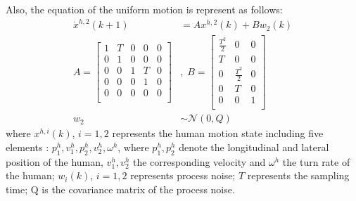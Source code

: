 \documentclass[letterpaper, 10 pt, conference]{ieeeconf}
\begin{document}
	Also, the equation of the uniform motion is represent as follows:
	\begin{subequations}
		\begin{align*}
			\dot{x}^{h,2}(k+1)&= Ax^{h,2}(k)+Bw_2(k) \label{eqn:h_d_dyn}\\
			A=\left[
			\begin{array}{ccccc}
				1& T& 0& 0& 0\\
				0& 1& 0& 0& 0\\
				0& 0& 1& T& 0\\
				0& 0& 0& 1& 0\\
				0& 0& 0& 0& 0\\
			\end{array}\right]&,\;
			B=\left[
			\begin{array}{ccc}
				\frac{T^2}{2}& 0& 0\\
				T& 0& 0\\
				0& \frac{T^2}{2}& 0\\
				0& T& 0\\
				0& 0& 1\\
			\end{array}\right] \\
			w_2&\sim\mathcal{N}(0,Q)
		\end{align*}
	\end{subequations}
	where $x^{h,i}(k)$, $i=1,2$ represents the human motion state including five elements : $p^h_1,v^h_1,p^h_2,v^h_2,\omega^h$, where $p^h_1,p^h_2$ denote the longitudinal and lateral position of the human, $v^h_1,v^h_2$ the corresponding velocity and $\omega^h$ the turn rate of the human; $w_i(k)$, $i=1,2$ represents process noise; $T$ represents the sampling time; Q is the covariance matrix of the process noise.
	
\end{document}
